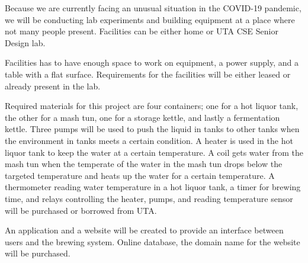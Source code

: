 
Because we are currently facing an unusual situation in the COVID-19 pandemic, we will be conducting lab experiments and building equipment at a place where not many people present. Facilities can be either home or UTA CSE Senior Design lab. 

Facilities has to have enough space to work on equipment, a power supply, and a table with a flat surface. Requirements for the facilities will be either leased or already present in the lab. 

Required materials for this project are four containers; one for a hot liquor tank, the other for a mash tun, one for a storage kettle, and lastly a fermentation kettle. Three pumps will be used to push the liquid in tanks to other tanks when the environment in tanks meets a certain condition. A heater is used in the hot liquor tank to keep the water at a certain temperature. A coil gets water from the mash tun when the temperate of the water in the mash tun drops below the targeted temperature and heats up the water for a certain temperature. A thermometer reading water temperature in a hot liquor tank, a timer for brewing time, and relays controlling the heater, pumps, and reading temperature sensor will be purchased or borrowed from UTA. 

An application and a website will be created to provide an interface between users and the brewing system. Online database, the domain name for the website will be purchased.
